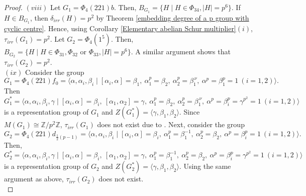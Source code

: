 \documentclass[a4paper,11pt]{amsart}
\numberwithin{equation}{section}
\numberwithin{equation}{subsection}
\newcommand{\Z}{\mathbb{Z}}
\newcommand{\tg}{\tau(G)}
\begin{document}
\begin{proof}
$(viii)$ Let $G_1 = \Phi_{4}(221)b$. Then, $B_{G_1}= \{H \mid H \in \Phi_{34}, |H|= p^6 \}$. If $H \in B_{G_1}$, then $\delta_{irr}(H)= p^2$ by Theorem \ref{embedding degree of a p group with cyclic centre}. Hence, using Corollary \ref{Elementary abelian Schur multiplier}$(i)$, $\tau_{irr}(G_1)= p^2$.
Let $G_2 = \Phi_{4}(1^5)$. Then, $B_{G_2} = \{H \mid H \in \Phi_{31}, \Phi_{32} \text{ or } \Phi_{33}, |H|= p^6\}$. A similar argument shows that $\tau_{irr}(G_2)= p^2$. \\

$(ix)$
Consider the group $$G_1= \Phi_4(221){f_0}
= \langle \alpha, \alpha_i,  \beta_i \mid [\alpha_i, \alpha] = \beta_1,\ 
\alpha_1^p = \beta_2,\ \alpha_2^p = \beta_1^{\,\nu}, \ \alpha^p = \beta_1^p = 1 \ (i = 1,2) \rangle.$$ Then $G_1^* = \langle \alpha, \alpha_i,  \beta_i, \gamma \mid [\alpha_i, \alpha] = \beta_i,\ [\alpha_1, \alpha_2] = \gamma,\ \alpha_1^p = \beta_2,\ \alpha_2^p = \beta_1^{\,\nu}, \ \alpha^p = \beta_i^p = \gamma^{p^2}= 1 \ (i = 1,2) \rangle$ is a representation group of $G_1$ and $Z(G_1^*) = \langle \gamma, \beta_1, \beta_2 \rangle$. Since $M(G_1) \cong \Z/p^2\Z$, $\tau_{irr}(G_1)$ does not exist due to \cite[Chapter 4, Theorem 3.1]{karpilovsky2}. 
Next, consider the group $$G_2 = \Phi_4(221)d_{\tfrac{1}{2}(p-1)} = \langle \alpha, \alpha_i,  \beta_i \mid [\alpha_i, \alpha] = \beta_i,\ \alpha_1^p = \beta_1^{-1},\ \alpha_2^p = \beta_2,\ \alpha^p = \beta_i^p = 1 \ (i = 1,2) \rangle.$$ Then, $G_2^* = \langle \alpha, \alpha_i,  \beta_i, \gamma \mid [\alpha_i, \alpha] = \beta_i,\ [\alpha_1, \alpha_2] = \gamma,\ \alpha_1^p = \beta_1^{-1},\ \alpha_2^p = \beta_2,\ \alpha^p = \beta_i^p = \gamma^{p^2}= 1 \ (i = 1,2) \rangle$ is a representation group of $G_2$ and $Z(G_2^*) = \langle \gamma, \beta_1, \beta_2 \rangle$. Using the same argument as above, $\tau_{irr}(G_2)$ does not exist. \\


\end{proof}
\end{document}
